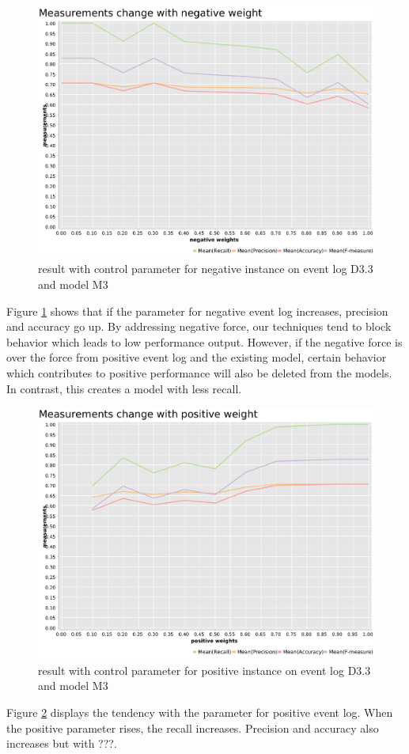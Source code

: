 \begin{figure}[htb]
	\includegraphics[width=\linewidth]{figures/evaluation/M3-D43-neg-weight-plot.pdf}
	\caption{result with control parameter for negative instance on event log D3.3 and model M3}
	\label{fig:neg-weight}
\end{figure}
Figure \ref{fig:neg-weight} shows that if the parameter for negative event log increases, precision and accuracy go up. By addressing negative force, our techniques tend to block behavior which leads to low performance output. However, if the negative force is over the force from positive event log and the existing model, certain behavior which contributes to positive performance will also be deleted from the models. In contrast, this creates a model with less recall. 


\begin{figure}[htb]
	\includegraphics[width=\linewidth]{figures/evaluation/M3-D43-pos-weight-plot.pdf}
	\caption{result with control parameter for positive instance on event log D3.3 and model M3}
	\label{fig:pos-weight}
\end{figure}
Figure \ref{fig:pos-weight} displays the tendency with the parameter for positive event log. When the positive parameter rises, the recall increases. Precision and accuracy also increases but with ???.